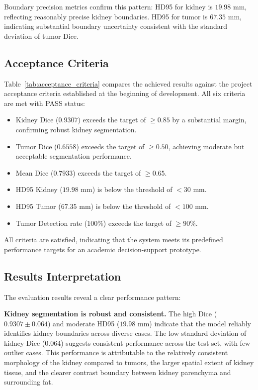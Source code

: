 Boundary precision metrics confirm this pattern: HD95 for kidney is $19.98$ mm, reflecting reasonably precise kidney boundaries. HD95 for tumor is $67.35$ mm, indicating substantial boundary uncertainty consistent with the standard deviation of tumor Dice.

\subsection{Acceptance Criteria}



Table~\ref{tab:acceptance_criteria} compares the achieved results against the project acceptance criteria established at the beginning of development. All six criteria are met with PASS status:

\begin{itemize}
    \item Kidney Dice ($0.9307$) exceeds the target of $\geq 0.85$ by a substantial margin, confirming robust kidney segmentation.
    \item Tumor Dice ($0.6558$) exceeds the target of $\geq 0.50$, achieving moderate but acceptable segmentation performance.
    \item Mean Dice ($0.7933$) exceeds the target of $\geq 0.65$.
    \item HD95 Kidney ($19.98$ mm) is below the threshold of $< 30$ mm.
    \item HD95 Tumor ($67.35$ mm) is below the threshold of $< 100$ mm.
    \item Tumor Detection rate ($100\%$) exceeds the target of $\geq 90\%$.
\end{itemize}

All criteria are satisfied, indicating that the system meets its predefined performance targets for an academic decision-support prototype.

\subsection{Results Interpretation}

The evaluation results reveal a clear performance pattern:

\textbf{Kidney segmentation is robust and consistent.} The high Dice ($0.9307 \pm 0.064$) and moderate HD95 ($19.98$ mm) indicate that the model reliably identifies kidney boundaries across diverse cases. The low standard deviation of kidney Dice ($0.064$) suggests consistent performance across the test set, with few outlier cases. This performance is attributable to the relatively consistent morphology of the kidney compared to tumors, the larger spatial extent of kidney tissue, and the clearer contrast boundary between kidney parenchyma and surrounding fat.

